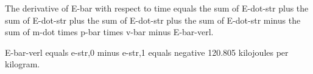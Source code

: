 The derivative of E-bar with respect to time equals the sum of E-dot-str plus the sum of E-dot-str plus the sum of E-dot-str plus the sum of E-dot-str minus the sum of m-dot times p-bar times v-bar minus E-bar-verl.

E-bar-verl equals e-str,0 minus e-str,1 equals negative 120.805 kilojoules per kilogram.